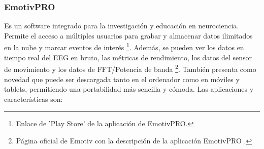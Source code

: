 \subsubsection{EmotivPRO}
Es un software integrado para la investigación y educación en neurociencia. Permite el acceso a múltiples usuarios para grabar y almacenar datos ilimitados en la nube y marcar eventos de interés \cite{emotivPro}\footnote{Enlace de 'Play Store' de la aplicación de EmotivPRO\cite{emotivPro}.}. Además, se pueden ver los datos en tiempo real del EEG en bruto, las métricas de rendimiento, los datos del sensor de movimiento y los datos de FFT/Potencia de banda \cite{emotivProWeb}\footnote{Página oficial de Emotiv con la descripción de la aplicación EmotivPRO \cite{emotivProWeb}.}. También presenta como novedad que puede ser descargada tanto en el ordenador como en móviles y tablets, permitiendo una portabilidad más sencilla y cómoda. Las aplicaciones y características son:
